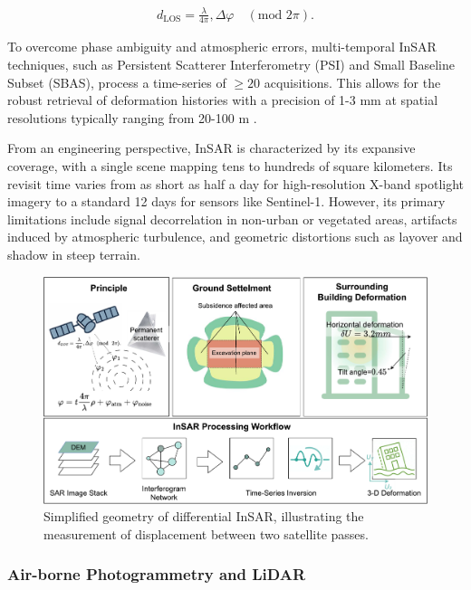 \documentclass[preprint,11pt,authoryear,3p]{elsarticle}
\begin{document}
\begin{align}
  d_{\mathrm{LOS}} = \frac{\lambda}{4\pi},\Delta\varphi
  \quad (\text{mod } 2\pi).
  \label{eq:insar}
\end{align}

To overcome phase ambiguity and atmospheric errors, multi-temporal InSAR techniques, such as Persistent Scatterer Interferometry (PSI) and Small Baseline Subset (SBAS), process a time-series of $\ge 20$ acquisitions. This allows for the robust retrieval of deformation histories with a precision of 1-3 mm at spatial resolutions typically ranging from 20-100 m \citep{ferretti1999permanent, Ferretti2011SqueeSAR, park2024insar}.

From an engineering perspective, InSAR is characterized by its expansive coverage, with a single scene mapping tens to hundreds of square kilometers. Its revisit time varies from as short as half a day for high-resolution X-band spotlight imagery to a standard 12 days for sensors like Sentinel-1\citep{SAMSONOV2024114049}. However, its primary limitations include signal decorrelation in non-urban or vegetated areas, artifacts induced by atmospheric turbulence, and geometric distortions such as layover and shadow in steep terrain\citep{GIUDICEPIETRO2024104060}.

\begin{figure}[htbp]
 \centering
 \includegraphics[width=1\linewidth]{imgs/InSAR_Flow.pdf}
 \caption{Simplified geometry of differential InSAR, illustrating the measurement of displacement between two satellite passes.}
 \label{fig:insar_principle}
\end{figure}

\subsubsection{Air-borne Photogrammetry and LiDAR}
\end{document}

